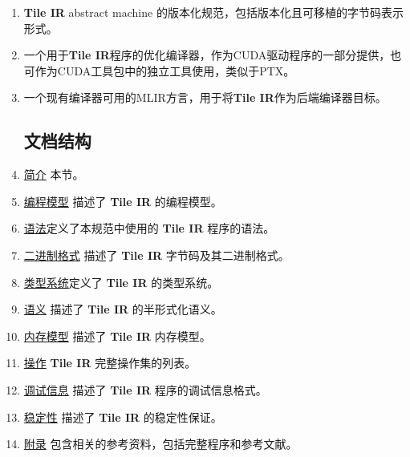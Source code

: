 \documentclass{article}
\begin{document}
\begin{enumerate}
\item \textbf{Tile IR} abstract machine 的版本化规范，包括版本化且可移植的字节码表示形式。
\item 一个用于\textbf{Tile IR}程序的优化编译器，作为CUDA驱动程序的一部分提供，也可作为CUDA工具包中的独立工具使用，类似于PTX。
\item 一个现有编译器可用的MLIR方言，用于将\textbf{Tile IR}作为后端编译器目标。


\subsection{文档结构}

\item \href{https://docs.nvidia.com/cuda/tile-ir/latest/sections/introduction.html#section-introduction}{简介} 本节。
\item \href{https://docs.nvidia.com/cuda/tile-ir/latest/sections/prog_model.html#section-prog-model}{编程模型} 描述了 \textbf{Tile IR} 的编程模型。
\item \href{https://docs.nvidia.com/cuda/tile-ir/latest/sections/syntax.html#section-syntax}{语法}定义了本规范中使用的 \textbf{Tile IR} 程序的语法。
\item \href{https://docs.nvidia.com/cuda/tile-ir/latest/sections/bytecode.html#section-bytecode}{二进制格式} 描述了 \textbf{Tile IR} 字节码及其二进制格式。
\item \href{https://docs.nvidia.com/cuda/tile-ir/latest/sections/types.html#section-types}{类型系统}定义了 \textbf{Tile IR} 的类型系统。
\item \href{https://docs.nvidia.com/cuda/tile-ir/latest/sections/semantics.html#section-semantics}{语义} 描述了 \textbf{Tile IR} 的半形式化语义。
\item \href{https://docs.nvidia.com/cuda/tile-ir/latest/sections/memory_model.html#section-memory-model}{内存模型} 描述了 \textbf{Tile IR} 内存模型。
\item \href{https://docs.nvidia.com/cuda/tile-ir/latest/sections/operations.html#section-operations}{操作} \textbf{Tile IR} 完整操作集的列表。
\item \href{https://docs.nvidia.com/cuda/tile-ir/latest/sections/debug_info.html#section-debug-info}{调试信息} 描述了 \textbf{Tile IR} 程序的调试信息格式。
\item \href{https://docs.nvidia.com/cuda/tile-ir/latest/sections/stability.html#section-stability}{稳定性} 描述了 \textbf{Tile IR} 的稳定性保证。
\item \href{https://docs.nvidia.com/cuda/tile-ir/latest/sections/appendix.html#section-appendix}{附录} 包含相关的参考资料，包括完整程序和参考文献。
\end{enumerate}
\end{document}
